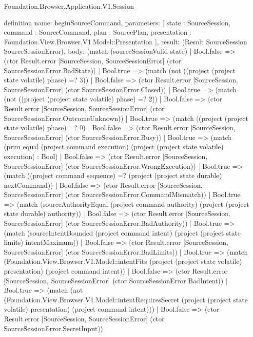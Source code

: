 \begin{lexlean}{Foundation.Browser.Application.V1.Session}
\begin{semanticmodule}
definition{
  name: beginSourceCommand,
  parameters: [
    state : SourceSession,
    command : SourceCommand,
    plan : SourcePlan,
    presentation : Foundation.View.Browser.V1.Model::Presentation
  ],
  result: (Result SourceSession SourceSessionError),
  body: (match (sourceSessionValid state)
    | Bool.false => (ctor Result.error [SourceSession, SourceSessionError] (ctor SourceSessionError.BadState))
    | Bool.true => (match (not ((project (project state volatile) phase) =? 3))
      | Bool.false => (ctor Result.error [SourceSession, SourceSessionError] (ctor SourceSessionError.Closed))
      | Bool.true => (match (not ((project (project state volatile) phase) =? 2))
        | Bool.false => (ctor Result.error [SourceSession, SourceSessionError] (ctor SourceSessionError.OutcomeUnknown))
        | Bool.true => (match ((project (project state volatile) phase) =? 0)
          | Bool.false => (ctor Result.error [SourceSession, SourceSessionError] (ctor SourceSessionError.Busy))
          | Bool.true => (match (prim equal (project command execution) (project (project state volatile) execution) : Bool)
            | Bool.false => (ctor Result.error [SourceSession, SourceSessionError] (ctor SourceSessionError.WrongExecution))
            | Bool.true => (match ((project command sequence) =? (project (project state durable) nextCommand))
              | Bool.false => (ctor Result.error [SourceSession, SourceSessionError] (ctor SourceSessionError.CommandMismatch))
              | Bool.true => (match (sourceAuthorityEqual (project command authority) (project (project state durable) authority))
                | Bool.false => (ctor Result.error [SourceSession, SourceSessionError] (ctor SourceSessionError.BadAuthority))
                | Bool.true => (match (sourceIntentBounded (project command intent) (project (project state limits) intentMaximum))
                  | Bool.false => (ctor Result.error [SourceSession, SourceSessionError] (ctor SourceSessionError.BadLimits))
                  | Bool.true => (match (Foundation.View.Browser.V1.Model::intentFits (project (project state volatile) presentation) (project command intent))
                    | Bool.false => (ctor Result.error [SourceSession, SourceSessionError] (ctor SourceSessionError.BadIntent))
                    | Bool.true => (match (not (Foundation.View.Browser.V1.Model::intentRequiresSecret (project (project state volatile) presentation) (project command intent)))
                      | Bool.false => (ctor Result.error [SourceSession, SourceSessionError] (ctor SourceSessionError.SecretInput))
}
\end{semanticmodule}
\end{lexlean}
